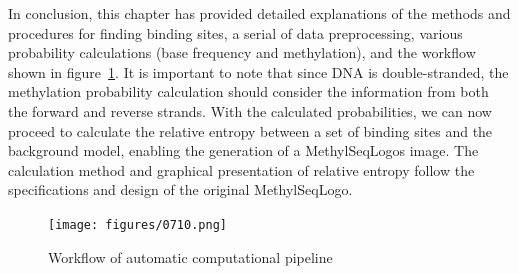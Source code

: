 \documentclass{PHlab-thesis}
\begin{document}
\begin{table}[H]
	\centering
	\caption{Detailed information about the WGBS files from the ENCODE}
	\label{table:WGBSinfo}
\end{table}
In conclusion, this chapter has provided detailed explanations of the methods and procedures for finding binding sites, a serial of data preprocessing, various probability calculations (base frequency and methylation), and the workflow shown in figure~\ref{fig:Automatipipeline}. It is important to note that since DNA is double-stranded, the methylation probability calculation should consider the information from both the forward and reverse strands. With the calculated probabilities, we can now proceed to calculate the relative entropy between a set of binding sites and the background model, enabling the generation of a MethylSeqLogos image. The calculation method and graphical presentation of relative entropy follow the specifications and design of the original MethylSeqLogo.
\clearpage
\begin{figure}
	\centering
	\texttt{[image: figures/0710.png]}
	\caption{Workflow of automatic computational pipeline}
	\label{fig:Automatipipeline} 
\end{figure}
\end{document}
